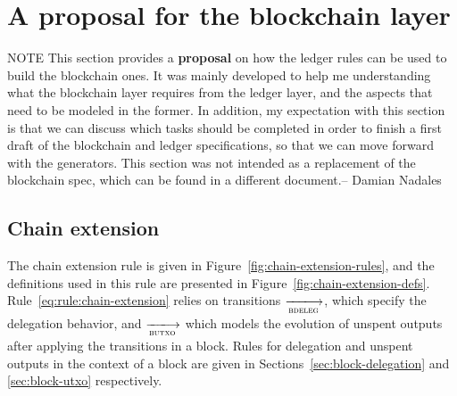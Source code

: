 \documentclass[11pt,a4paper]{article}
\newenvironment{note}
  {\begin{bclogo}[logo=\bcattention, couleur=orange!10, arrondi=0.2]{ NOTE}}
  {\end{bclogo}}
\newcommand{\trans}[2]{\xlongrightarrow[\textsc{#1}]{#2}}
\begin{document}
\section{A proposal for the blockchain layer}
\label{sec:blockchain-layer}

\begin{note}
  This section provides a \textbf{proposal} on how the ledger rules can be used
  to build the blockchain ones. It was mainly developed to help me
  understanding what the blockchain layer requires from the ledger layer, and
  the aspects that need to be modeled in the former. In addition, my
  expectation with this section is that we can discuss which tasks should be
  completed in order to finish a first draft of the blockchain and ledger
  specifications, so that we can move forward with the generators. This section
  was not intended as a replacement of the blockchain spec, which can be found
  in a different document.-- Damian Nadales
\end{note}

\subsection{Chain extension}
\label{sec:chain-extension}

The chain extension rule is given in Figure~\ref{fig:chain-extension-rules},
and the definitions used in this rule are presented in
Figure~\ref{fig:chain-extension-defs}. Rule~\ref{eq:rule:chain-extension}
relies on transitions $\trans{bdeleg}{}$, which specify the delegation
behavior, and $\trans{butxo}{}$ which models the evolution of unspent outputs
after applying the transitions in a block. Rules for delegation and unspent
outputs in the context of a block are given in
Sections~\ref{sec:block-delegation} and \ref{sec:block-utxo} respectively.
\end{document}
